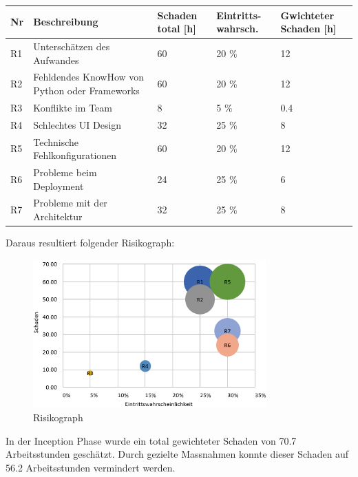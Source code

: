 \renewcommand{\arraystretch}{1.2}
\begin{table}[h]
	\centering
	\begin{tabu} to 0.9
	\toprule
	Nr & Beschreibung & Schaden total [h] & Eintritts-wahrsch. & Gwichteter Schaden [h]\\ 
	\midrule
	R1 & Unterschätzen des Aufwandes & 60 & 20 \% & 12 \\
	R2 & Fehldendes KnowHow von \newline Python oder Frameworks & 60 & 20 \% & 12 \\
	R3 & Konflikte im Team & 8 & 5 \% & 0.4 \\
	R4 & Schlechtes UI Design & 32 & 25 \% & 8 \\
	R5 & Technische \newline Fehlkonfigurationen & 60 & 20 \% & 12 \\
	R6 & Probleme beim Deployment & 24 & 25 \% & 6 \\ 
	R7 & Probleme mit der Architektur & 32 & 25 \% & 8 \\
	\bottomrule
	\end{tabu}
\end{table}

\newpage
Daraus resultiert folgender Risikograph: 
\begin{figure}[H]
	\begin{center}
	
	\includegraphics[width=0.8\textwidth,height=\textheight,keepaspectratio]{images/risikoanalyse.png}
	\caption{Risikograph}
	\end{center}
\end{figure}

\noindent In der Inception Phase wurde ein total gewichteter Schaden von 70.7 Arbeitsstunden geschätzt. Durch gezielte Massnahmen konnte dieser Schaden auf 56.2 Arbeitsstunden vermindert werden. \\

